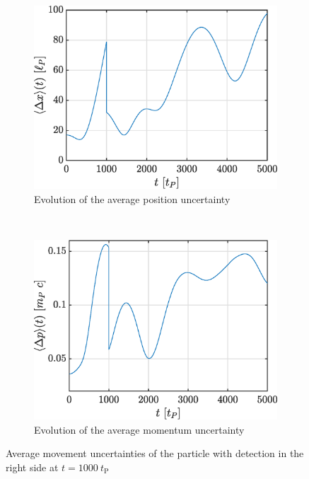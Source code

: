 \documentclass[a4paper,12pt,twoside]{article}
\begin{document}
\begin{figure}[h]
        \centering
        \begin{subfigure}[t]{0.45\textwidth}
          \includegraphics[width=\textwidth]{graphs/iv_det_delx.eps}
          \caption{Evolution of the average position uncertainty}
          \label{fig:iv_det_delx}
        \end{subfigure}
        ~
        \begin{subfigure}[t]{0.45\textwidth}
          \includegraphics[width=\textwidth]{graphs/iv_det_delp.eps}
          \caption{Evolution of the average momentum uncertainty}
          \label{fig:iv_det_delp}
        \end{subfigure}
        \caption{Average movement uncertainties of the particle with detection in the right side at $t=1000~t_\text{P}$}
        \label{fig:iv_det_del}
\end{figure}
\end{document}
